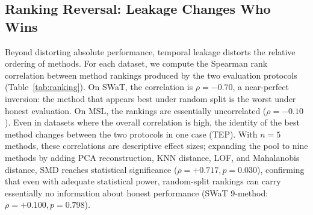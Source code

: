 \documentclass[preprint,12pt]{elsarticle}
\begin{document}
\begin{table}[htbp]
\centering
\small\setlength{\tabcolsep}{5pt}
\caption{Overlap ablation on SWaT (LSTM-AE, $L=256$, mean of 3 seeds).}
\label{tab:overlap}
\end{table}

\subsection{Ranking Reversal: Leakage Changes Who Wins}

Beyond distorting absolute performance, temporal leakage distorts the relative ordering of methods. For each dataset, we compute the Spearman rank correlation between method rankings produced by the two evaluation protocols (Table~\ref{tab:ranking}). On SWaT, the correlation is $\rho = -0.70$, a near-perfect inversion: the method that appears best under random split is the worst under honest evaluation. On MSL, the rankings are essentially uncorrelated ($\rho = -0.10$). Even in datasets where the overall correlation is high, the identity of the best method changes between the two protocols in one case (TEP). With $n = 5$ methods, these correlations are descriptive effect sizes; expanding the pool to nine methods by adding PCA reconstruction, KNN distance, LOF, and Mahalanobis distance, SMD reaches statistical significance ($\rho = +0.717, p = 0.030$), confirming that even with adequate statistical power, random-split rankings can carry essentially no information about honest performance (SWaT 9-method: $\rho = +0.100, p = 0.798$).
\end{document}
